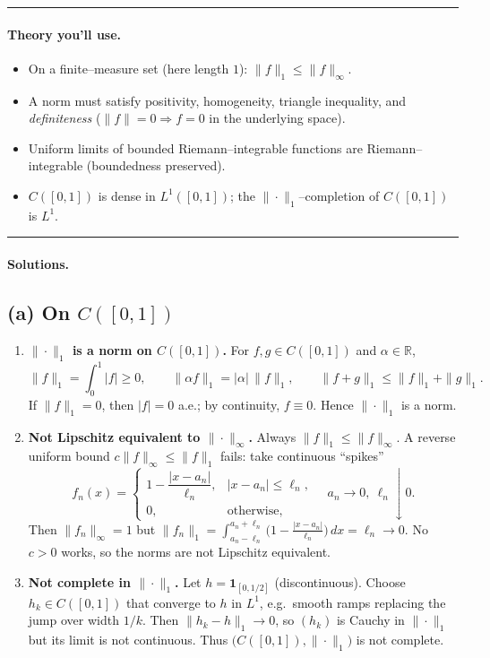\documentclass[12pt,a4paper]{article}
\theoremstyle{plain}
\theoremstyle{definition}
\theoremstyle{remark}
\theoremstyle{remark}
\begin{document}
\noindent\rule{\linewidth}{0.6pt}

\paragraph{Theory you’ll use.}
\begin{itemize}
	\item On a finite–measure set (here length $1$): $\displaystyle \|f\|_{1}\le \|f\|_{\infty}$.
	\item A norm must satisfy positivity, homogeneity, triangle inequality, and \emph{definiteness}
	($\|f\|=0 \Rightarrow f=0$ in the underlying space).
	\item Uniform limits of bounded Riemann–integrable functions are Riemann–integrable (boundedness preserved).
	\item $C([0,1])$ is dense in $L^{1}([0,1])$; the $\|\cdot\|_{1}$–completion of $C([0,1])$ is $L^{1}$.
\end{itemize}

\noindent\rule{\linewidth}{0.6pt}

\paragraph{Solutions.}

\subsection*{(a) On $C([0,1])$}
\begin{enumerate}[1)]
	\item \textbf{$\|\cdot\|_{1}$ is a norm on $C([0,1])$.} For $f,g\in C([0,1])$ and $\alpha\in\mathbb{R}$,
	\[
	\|f\|_{1}=\int_{0}^{1}|f|\ge 0,\qquad
	\|\alpha f\|_{1}=|\alpha|\,\|f\|_{1},\qquad
	\|f+g\|_{1}\le \|f\|_{1}+\|g\|_{1}.
	\]
	If $\|f\|_{1}=0$, then $|f|=0$ a.e.; by continuity, $f\equiv 0$. Hence $\|\cdot\|_{1}$ is a norm.
	
	\item \textbf{Not Lipschitz equivalent to $\|\cdot\|_{\infty}$.}
	Always $\|f\|_{1}\le \|f\|_{\infty}$. A reverse uniform bound
	$c\|f\|_{\infty}\le \|f\|_{1}$ fails: take continuous “spikes”
	\[
	f_n(x)=\begin{cases}
		1-\dfrac{|x-a_n|}{\ell_n}, & |x-a_n|\le \ell_n,\\[4pt]
		0, & \text{otherwise},
	\end{cases}
	\quad a_n\to 0,\ \ell_n\downarrow 0.
	\]
	Then $\|f_n\|_{\infty}=1$ but $\|f_n\|_{1}=\int_{a_n-\ell_n}^{a_n+\ell_n}\!\!\big(1-\frac{|x-a_n|}{\ell_n}\big)\,dx
	=\ell_n\to 0$. No $c>0$ works, so the norms are not Lipschitz equivalent.
	
	\item \textbf{Not complete in $\|\cdot\|_{1}$.}
	Let $h=\mathbf{1}_{[0,1/2]}$ (discontinuous). Choose $h_k\in C([0,1])$ that converge to $h$ in $L^{1}$,
	e.g.\ smooth ramps replacing the jump over width $1/k$. Then $\|h_k-h\|_{1}\to 0$, so $(h_k)$ is Cauchy in
	$\|\cdot\|_{1}$ but its limit is not continuous. Thus $\big(C([0,1]),\|\cdot\|_{1}\big)$ is not complete.
\end{enumerate}
\end{document}
